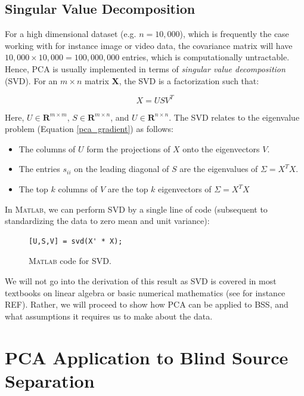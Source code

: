 \documentclass[11pt, oneside, a4paper]{report}
\begin{document}
\subsection{Singular Value Decomposition}

For a high dimensional dataset (e.g. $n = 10,000$), which is
frequently the case working with for instance image or video data, the
covariance matrix will have $10,000\times 10,000 = 100,000,000$
entries, which is computationally untractable. Hence, PCA is usually
implemented in terms of \emph{singular value decomposition} (SVD). For
an $m\times n$ matrix $\boldsymbol{X}$, the SVD is a factorization
such that:


\begin{equation}
  X = US V^{T}
\end{equation}


Here, $U \in \mathbf{R}^{m\times m}$, $S \in \mathbf{R}^{m\times n}$,
and $U \in \mathbf{R}^{n\times n}$. The SVD relates to the eigenvalue
problem (Equation \ref{pca_gradient}) as follows:


\begin{itemize}
\item The columns of $U$ form the projections of $X$ onto the
  eigenvectors $V$.
  \item The entries $s_{ii}$ on the leading diagonal of $S$ are the
    eigenvalues of $\Sigma = X^TX$.
  \item The top $k$ columns of $V$ are the top $k$ eigenvectors of
    $\Sigma = X^T X$
\end{itemize}


In \textsc{Matlab}, we can perform SVD by a single line of code
(subsequent to standardizing the data to zero mean and unit variance):


\begin{figure}[!htpb]
  \begin{lstlisting}[frame=single]
    [U,S,V] = svd(X' * X);
  \end{lstlisting}
  \caption{\textsc{Matlab} code for SVD.}
  \label{svd_code}
\end{figure}

We will not go into the derivation of this result as SVD is covered
in most textbooks on linear algebra or basic numerical
mathematics (see for instance REF). Rather, we will proceed to show how PCA can be applied to
BSS, and what assumptions it requires us to make about the data.



\section{PCA Application to Blind Source Separation}\label{pca_bss}
\end{document}
